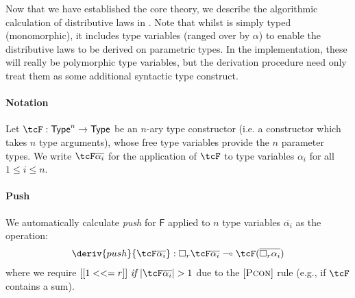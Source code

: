 Now that we have established the core theory, we describe the
algorithmic calculation of distributive laws in \grminip{}.
Note that whilst \grminip{} is simply typed (monomorphic), it includes
type variables (ranged over by $\alpha$) to enable
the distributive laws to be derived on parametric types. In the implementation,
these will really be polymorphic type variables, but the derivation
procedure need only treat them as some additional syntactic type construct.


%
\paragraph{Notation}
Let $\tcF : \mathsf{Type}^n \rightarrow \mathsf{Type}$
be an $n$-ary type constructor (i.e. a constructor which takes $n$ type arguments), whose free type variables
provide the $n$ parameter types. We write $\tcF \overline{\alpha_i}$ for
the application of $\tcF$ to
type variables $\alpha_i$ for all $1 \leq i \leq n$.

%
\paragraph{Push}
We automatically
calculate \emph{push} for $\mathsf{F}$
applied to $n$ type variables
$\overline{\alpha_i}$
as the operation:
%
\begin{align*}
\deriv{push}{\tcF \overline{\alpha_i}} : \Box_{r} \tcF \overline{\alpha_i}
  \multimap  \tcF  (\overline{\Box_{r} \alpha_i})
 \end{align*}
where we require $[[ 1 <<= r ]]\ \textit{if}\ |\tcF \overline{\alpha_i}| > 1$
due to the $[\textsc{Pcon}]$ rule (e.g., if $\tcF$ contains a sum).


